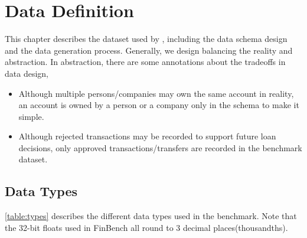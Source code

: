 \chapter{Data Definition}
\label{section:data-definition}

This chapter describes the dataset used by \ldbcfinbench, including the data schema design
and the data generation process. Generally, we design \ldbcfinbench balancing the reality
and abstraction. In abstraction, there are some annotations about the tradeoffs in data design,
\begin{itemize}
    \item Although multiple persons/companies may own the same account in reality, an account
    is owned by a person or a company only in the schema to make it simple.
    \item Although rejected transactions may be recorded to support future loan decisions,
    only approved transactions/transfers are recorded in the benchmark dataset.
\end{itemize}

\section{Data Types}

\autoref{table:types} describes the different data types used in the benchmark.
Note that the 32-bit floats used in FinBench all round to 3 decimal places(thousandths).

